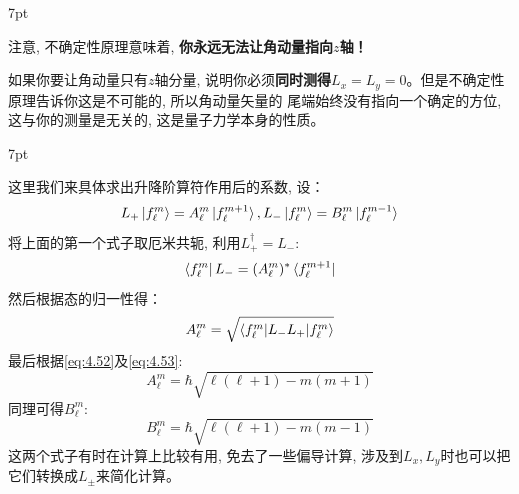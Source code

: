 \documentclass[a4paper,zihao=-4,linespread=1]{ctexrep}
\newenvironment{thinknote}{%
\def\FrameCommand{%
\hspace{1pt}%
{\color{BurlyWood}\vrule width 2pt}%
{\color{formalshade}\vrule width 4pt}%
\colorbox{formalshade}%
}%
\MakeFramed{\advance\hsize-\width\FrameRestore}%
\noindent\hspace{-4.55pt}%
\begin{adjustwidth}{}{7pt}%
\vspace{2pt}\vspace{2pt}%
}
{%
\vspace{2pt}\end{adjustwidth}\endMakeFramed%
}
\begin{document}
    \begin{thinknote}
        注意, 不确定性原理意味着, \textbf{你永远无法让角动量指向$z$轴！}

        \setlength\parindent{2em}如果你要让角动量只有$z$轴分量, 说明你必须\textbf{同时测得}$L_x=L_y=0$。但是不确定性原理告诉你这是不可能的, 所以角动量矢量的
        尾端始终没有指向一个确定的方位, 这与你的测量是无关的, 这是量子力学本身的性质。
    \end{thinknote}
    \begin{thinknote}
        这里我们来具体求出升降阶算符作用后的系数, 设：
        \[L_+\ket{f_\ell^m}=A_\ell^m\ket{f_\ell^{m+1}},L_-\ket{f_\ell^m}=B_\ell^m\ket{f_\ell^{m-1}}\]
        将上面的第一个式子取厄米共轭, 利用$L_+^\dagger=L_-$:
        \[\bra{f_\ell^m}L_-=(A_\ell^m)^*\bra{f_\ell^{m+1}}\]
        然后根据态的归一性得：
        \[A_\ell^m=\sqrt{\braket{f_\ell^m|L_-L_+|f_\ell^m}}\]
        最后根据\ref{eq:4.52}及\ref{eq:4.53}:
        \[A_\ell^m=\hbar\sqrt{\ell(\ell+1)-m(m+1)}\]
        同理可得$B_\ell^m$:
        \[B_\ell^m=\hbar\sqrt{\ell(\ell+1)-m(m-1)}\]
        这两个式子有时在计算上比较有用, 免去了一些偏导计算, 涉及到$L_x,L_y$时也可以把它们转换成$L_\pm$来简化计算。
    \end{thinknote}
\end{document}

